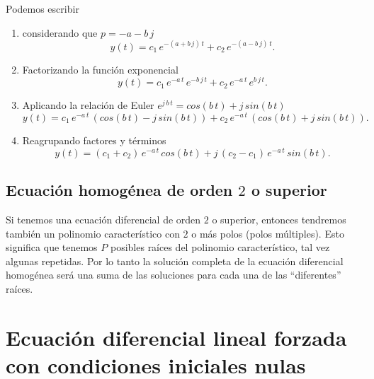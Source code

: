 Podemos escribir
\begin{enumerate}
\item considerando que $p = -a - b \, j$
\begin{equation}
 y(t) = c_{1} \, e^{-(a + b \, j) \, t} + c_{2} \, e^{-(a - b \, j) \, t}.
\end{equation}
\item Factorizando la función exponencial
\begin{equation}
 y(t) = c_{1} \, e^{-a \, t} \, e^{-b \, j \, t} + c_{2} \, e^{-a \, t} \, e^{b \, j \, t}.
\end{equation}
\item Aplicando la relación de Euler $e^{j \, b \, t} = cos(b \, t) + j \, sin(b \, t)$
\begin{equation}
 y(t) = c_{1} \, e^{-a \, t} \, (cos(b \, t) - j \, sin(b \, t)) + 
        c_{2} \, e^{-a \, t} \, (cos(b \, t) + j \, sin(b \, t)).
\end{equation}
\item Reagrupando factores y términos
\begin{equation}
 y(t) = (c_{1} + c_{2}) \, e^{-a \, t} \, cos(b \, t) + j \,
        (c_{2} - c_{1}) \, e^{-a \, t} \, sin(b \, t).
\end{equation}
\end{enumerate}

\subsection{Ecuación homogénea de orden $2$ o superior}

Si tenemos una ecuación diferencial de orden $2$ o superior, entonces tendremos también un polinomio característico con $2$ o más polos (polos múltiples). Esto significa que tenemos $P$ posibles raíces del polinomio característico, tal vez algunas repetidas. Por lo tanto la solución completa de la ecuación diferencial homogénea será una suma de las soluciones para cada una de las ``diferentes'' raíces. 

\section{Ecuaci\'{o}n diferencial lineal forzada con condiciones iniciales nulas}

